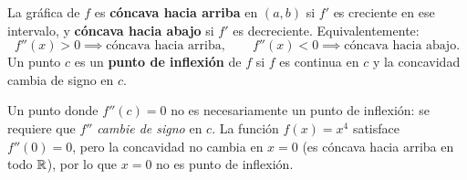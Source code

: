 \begin{definition}
La gráfica de $f$ es \textbf{cóncava hacia arriba} en $(a,b)$ si $f'$
es creciente en ese intervalo, y \textbf{cóncava hacia abajo} si $f'$
es decreciente. Equivalentemente:
\[
f''(x)>0 \implies \text{cóncava hacia arriba}, \qquad
f''(x)<0 \implies \text{cóncava hacia abajo}.
\]
Un punto $c$ es un \textbf{punto de inflexión} de $f$ si $f$ es continua
en $c$ y la concavidad cambia de signo en $c$.
\end{definition}

\begin{rem}
Un punto donde $f''(c)=0$ no es necesariamente un punto de inflexión:
se requiere que $f''$ \emph{cambie de signo} en $c$. La función
$f(x)=x^4$ satisface $f''(0)=0$, pero la concavidad no cambia en $x=0$
(es cóncava hacia arriba en todo ${\mathbb R}$), por lo que $x=0$ no es punto de
inflexión.
\end{rem}


